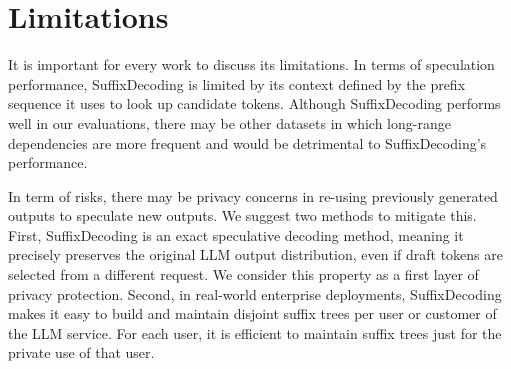\section*{Limitations}

It is important for every work to discuss its limitations. In terms of speculation performance, SuffixDecoding is limited by its context defined by the prefix sequence it uses to look up candidate tokens. Although SuffixDecoding performs well in our evaluations, there may be other datasets in which long-range dependencies are more frequent and would be detrimental to SuffixDecoding's performance.

In term of risks, there may be privacy concerns in re-using previously generated outputs to speculate new outputs. 
 We suggest two methods to mitigate this.
 First, SuffixDecoding is an exact speculative decoding method, meaning it precisely preserves the original LLM output distribution, even if draft tokens are selected from a different request. We consider this property as a first layer of privacy protection.
 Second, in real-world enterprise deployments, SuffixDecoding makes it easy to build and maintain disjoint suffix trees per user or customer of the LLM service. For each user, it is efficient to maintain suffix trees just for the private use of that user.